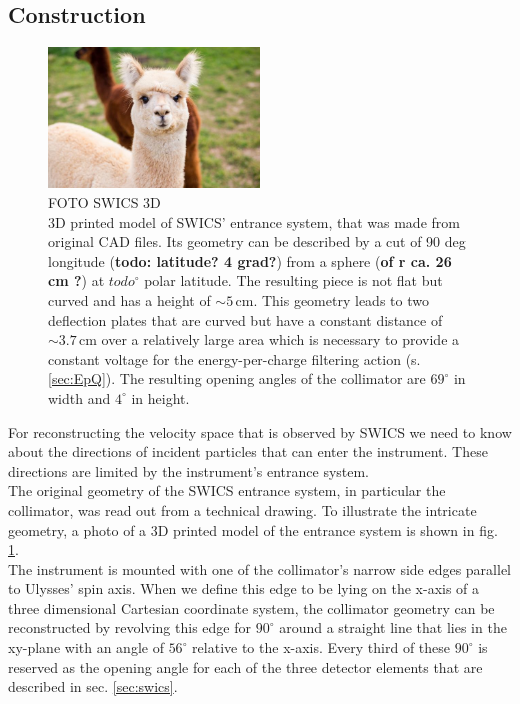 \subsection{Construction} 
\label{subsec:construction}
\begin{figure}[h]
	\includegraphics[width=0.5\textwidth]{Figures/dummy.jpg}
	\centering
	\caption{FOTO SWICS 3D \\ 3D printed model of SWICS' entrance system, that was made from original CAD files. Its geometry can be described by a cut of 90 deg longitude (\textbf{todo: latitude? 4 grad?}) from a sphere (\textbf{of r ca. 26 cm ?}) at $todo ^\circ$ polar latitude. The resulting piece is not flat but curved and has a height of $\sim 5\,\mathrm{cm}$. This geometry leads to two deflection plates that are curved but have a constant distance of $\sim 3.7\,\mathrm{cm}$ over a relatively large area which is necessary to provide a constant voltage for the energy-per-charge filtering action (s. \ref{sec:EpQ}). The resulting opening angles of the collimator are $69^\circ$ in width and $4^\circ$ in height.}
	\label{fig:3dcol}
\end{figure}
For reconstructing the velocity space that is observed by SWICS we need to know about the directions of incident particles that can enter the instrument. These directions are limited by the instrument's entrance system.
\\
The original geometry of the SWICS entrance system, in particular the collimator, was read out from a technical drawing. To illustrate the intricate geometry, a photo of a 3D printed model of the entrance system is shown in fig. \ref{fig:3dcol}.\\
The instrument is mounted with one of the collimator's narrow side edges parallel to Ulysses' spin axis. When we define this edge to be lying on the x-axis of a three dimensional Cartesian coordinate system, the collimator geometry can be reconstructed by revolving this edge for $90^\circ$ around a straight line that lies in the xy-plane with an angle of $56^\circ$ relative to the x-axis.  Every third of these $90^\circ$ is reserved as the opening angle for each of the three detector elements that are described in sec. \ref{sec:swics}. \\ \\
